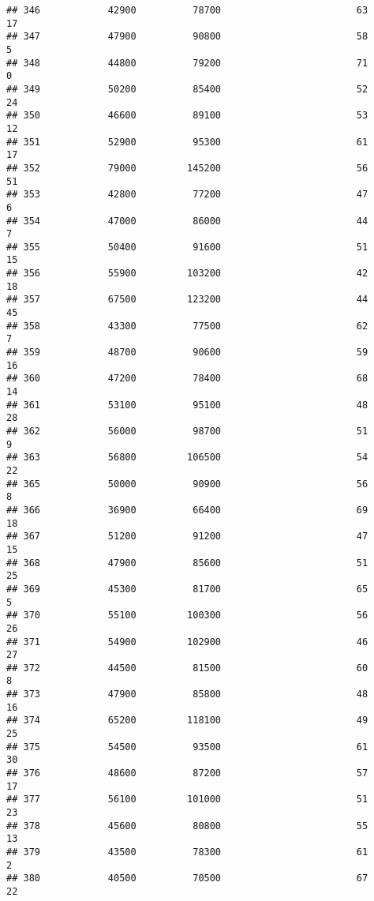\documentclass[
]{article}
\begin{document}
\begin{verbatim}
## 346            42900          78700                        63           17
## 347            47900          90800                        58            5
## 348            44800          79200                        71            0
## 349            50200          85400                        52           24
## 350            46600          89100                        53           12
## 351            52900          95300                        61           17
## 352            79000         145200                        56           51
## 353            42800          77200                        47            6
## 354            47000          86000                        44            7
## 355            50400          91600                        51           15
## 356            55900         103200                        42           18
## 357            67500         123200                        44           45
## 358            43300          77500                        62            7
## 359            48700          90600                        59           16
## 360            47200          78400                        68           14
## 361            53100          95100                        48           28
## 362            56000          98700                        51            9
## 363            56800         106500                        54           22
## 365            50000          90900                        56            8
## 366            36900          66400                        69           18
## 367            51200          91200                        47           15
## 368            47900          85600                        51           25
## 369            45300          81700                        65            5
## 370            55100         100300                        56           26
## 371            54900         102900                        46           27
## 372            44500          81500                        60            8
## 373            47900          85800                        48           16
## 374            65200         118100                        49           25
## 375            54500          93500                        61           30
## 376            48600          87200                        57           17
## 377            56100         101000                        51           23
## 378            45600          80800                        55           13
## 379            43500          78300                        61            2
## 380            40500          70500                        67           22

\end{verbatim}
\end{document}
